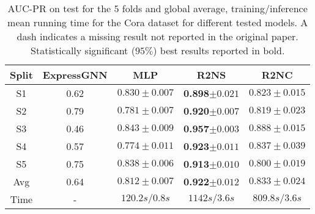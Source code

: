 \documentclass[journal]{IEEEtran}
\begin{document}
\begin{table}[th]
\centering
\caption{AUC-PR on test for the $5$ folds and global average, training/inference mean running time for the Cora dataset for different tested models.
A dash indicates a missing result not reported in the original paper.
Statistically significant ($95\%$) best results reported in bold.}
\begin{tabular}{c|cccc}
{\bfseries Split} & ExpressGNN \!\!\!\!\!\!\!\!\!\!& MLP & R2NS & R2NC \\
\hline
S1  & 0.62 \!\!\!\!\!\!\!\!\!\! & $0.830\pm0.007$ & {\bf 0.898}$\pm0.021$ & $0.823\pm0.015$\\
S2  & 0.79 \!\!\!\!\!\!\!\!\!\!& $0.781\pm0.007$ & {\bf 0.920}$\pm0.007$ 
& $0.819\pm0.023$\\
S3  & 0.46 \!\!\!\!\!\!\!\!\!\!& $0.843\pm0.009$ & {\bf 0.957}$\pm0.003$ & $0.888\pm0.015$\\
S4  & 0.57 \!\!\!\!\!\!\!\!\!\!& $0.774\pm0.011$ & {\bf 0.923}$\pm0.011$ & $0.837\pm0.039$\\
S5  & 0.75 \!\!\!\!\!\!\!\!\!\!& $0.838\pm0.006$ & {\bf 0.913}$\pm0.010$ & $0.800\pm0.019$\\
Avg & 0.64 \!\!\!\!\!\!\!\!\!\!& $0.812\pm0.007$ & {\bf 0.922}$\pm0.012$ & $0.833\pm0.024$\\
Time & - & $120.2s/0.8s$  & $1142s/3.6s$ & $809.8s/3.6s$
\end{tabular}
\label{tab:cora}
\end{table}
\end{document}
